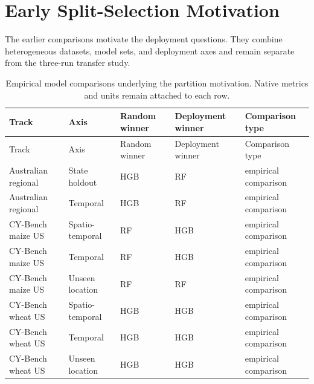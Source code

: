 \documentclass[runningheads]{venue/lncs/llncs}
\begin{document}
\section{Early Split-Selection Motivation}\label{sec:early-split}

The earlier comparisons motivate the deployment questions. They combine heterogeneous datasets, model sets, and deployment axes and remain separate from the three-run transfer study.

{\scriptsize
\begin{longtable}{p{2.25cm}p{1.8cm}p{1.65cm}p{1.65cm}p{2.4cm}}
\caption{Empirical model comparisons underlying the partition motivation. Native metrics and units remain attached to each row.}\label{tab:early-empirical}\\
\toprule
Track & Axis & Random winner & Deployment winner & Comparison type\\
\midrule
\endfirsthead
\toprule
Track & Axis & Random winner & Deployment winner & Comparison type\\
\midrule
\endhead
Australian regional & State holdout & HGB & RF & empirical comparison\\
Australian regional & Temporal & HGB & RF & empirical comparison\\
CY-Bench maize US & Spatio-temporal & RF & HGB & empirical comparison\\
CY-Bench maize US & Temporal & RF & HGB & empirical comparison\\
CY-Bench maize US & Unseen location & RF & RF & empirical comparison\\
CY-Bench wheat US & Spatio-temporal & HGB & HGB & empirical comparison\\
CY-Bench wheat US & Temporal & HGB & HGB & empirical comparison\\
CY-Bench wheat US & Unseen location & HGB & HGB & empirical comparison\\
\bottomrule
\end{longtable}
}
\end{document}
